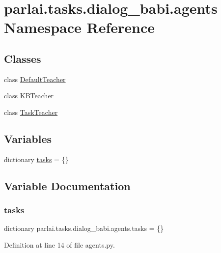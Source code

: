 \hypertarget{namespaceparlai_1_1tasks_1_1dialog__babi_1_1agents}{}\section{parlai.\+tasks.\+dialog\+\_\+babi.\+agents Namespace Reference}
\label{namespaceparlai_1_1tasks_1_1dialog__babi_1_1agents}
\subsection*{Classes}
\begin{DoxyCompactItemize}
\item 
class \hyperlink{classparlai_1_1tasks_1_1dialog__babi_1_1agents_1_1DefaultTeacher}{Default\+Teacher}
\item 
class \hyperlink{classparlai_1_1tasks_1_1dialog__babi_1_1agents_1_1KBTeacher}{K\+B\+Teacher}
\item 
class \hyperlink{classparlai_1_1tasks_1_1dialog__babi_1_1agents_1_1TaskTeacher}{Task\+Teacher}
\end{DoxyCompactItemize}
\subsection*{Variables}
\begin{DoxyCompactItemize}
\item 
dictionary \hyperlink{namespaceparlai_1_1tasks_1_1dialog__babi_1_1agents_a0cc1b4db6e2dd7227c0553805fb92e01}{tasks} = \{\}
\end{DoxyCompactItemize}


\subsection{Variable Documentation}
\mbox{\label{namespaceparlai_1_1tasks_1_1dialog__babi_1_1agents_a0cc1b4db6e2dd7227c0553805fb92e01}} 
\subsubsection{\texorpdfstring{tasks}{tasks}}
{\footnotesize\ttfamily dictionary parlai.\+tasks.\+dialog\+\_\+babi.\+agents.\+tasks = \{\}}



Definition at line 14 of file agents.\+py.


